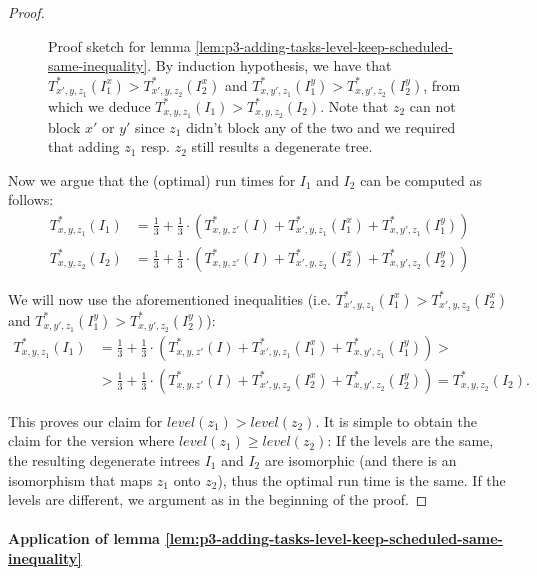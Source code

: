 \begin{proof}
\begin{figure}[t]
    \caption{Proof sketch for lemma \ref{lem:p3-adding-tasks-level-keep-scheduled-same-inequality}. By induction hypothesis, we have that $T^*_{x',y,z_1}(I^x_{1}) > T^*_{x',y,z_2}(I^x_{2})$ and $T^*_{x,y',z_1}(I^y_{1}) > T^*_{x,y',z_2}(I^y_{2})$, from which we deduce $T^*_{x,y,z_1}(I_1) > T^*_{x,y,z_2}(I_2)$. Note that $z_2$ can not block $x'$ or $y'$ since $z_1$ didn't block any of the two and we required that adding $z_1$ resp. $z_2$ still results a degenerate tree.}
    \label{fig:p3-adding-tasks-level-keep-scheduled-same-inequality}
  \end{figure}
  
  Now we argue that the (optimal) run times for $I_1$ and $I_2$ can be computed as follows:
  \begin{align*}
    T^*_{x,y,z_1}(I_1) & = 
      \frac{1}{3} + 
      \frac{1}{3}\cdot \left( 
        T_{x,y,z'}^*(I) + 
        T^*_{x',y,z_1}(I^x_{1}) +
        T^*_{x,y',z_1}(I^y_{1}) 
      \right)
      \\
    T^*_{x,y,z_2}(I_2) & = 
      \frac{1}{3} + 
      \frac{1}{3}\cdot \left( 
        T_{x,y,z'}^*(I) + 
        T^*_{x',y,z_2}(I^x_{2}) +
        T^*_{x,y',z_2}(I^y_{2}) 
      \right)
  \end{align*}

  We will now use the aforementioned inequalities (i.e. $T^*_{x',y,z_1}(I^x_{1}) > T^*_{x',y,z_2}(I^x_{2})$ and $T^*_{x,y',z_1}(I^y_{1}) > T^*_{x,y',z_2}(I^y_{2})$):
\begin{align*}
    T^*_{x,y,z_1}(I_1) & = 
      \frac{1}{3} + 
      \frac{1}{3}\cdot \left( 
        T_{x,y,z'}^*(I) + 
        T^*_{x',y,z_1}(I^x_{1}) +
        T^*_{x,y',z_1}(I^y_{1}) 
      \right)
      > 
      \\
      & >
      \frac{1}{3} + 
      \frac{1}{3}\cdot \left( 
        T_{x,y,z'}^*(I) + 
        T^*_{x',y,z_2}(I^x_{2}) +
        T^*_{x,y',z_2}(I^y_{2}) 
      \right) 
      = T^*_{x,y,z_2}(I_2).
  \end{align*}

  This proves our claim for $level(z_1) > level(z_2)$. It is simple to obtain the claim for the version where $level(z_1) \geq level(z_2)$: If the levels are the same, the resulting degenerate intrees $I_1$ and $I_2$ are isomorphic (and there is an isomorphism that maps $z_1$ onto $z_2$), thus the optimal run time is the same. If the levels are different, we argument as in the beginning of the proof.
\end{proof}

\paragraph{Application of lemma \ref{lem:p3-adding-tasks-level-keep-scheduled-same-inequality}}

